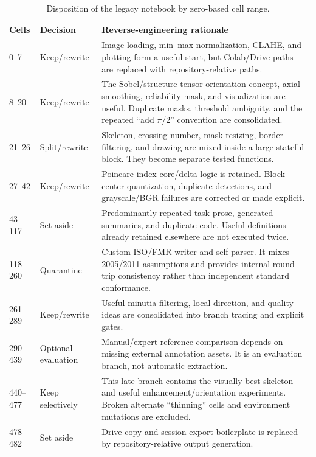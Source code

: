\documentclass[11pt]{article}
\begin{document}
\begin{table}[H]
\centering
\caption{Disposition of the legacy notebook by zero-based cell range.}
\label{tab:cellranges}
\small
\begin{tabularx}{\textwidth}{@{}p{1.45cm}p{2.65cm}X@{}}
\toprule
Cells & Decision & Reverse-engineering rationale \\
\midrule
0--7 & Keep/rewrite & Image loading, min--max normalization, CLAHE, and plotting form a useful start, but Colab/Drive paths are replaced with repository-relative paths. \\
8--20 & Keep/rewrite & The Sobel/structure-tensor orientation concept, axial smoothing, reliability mask, and visualization are useful. Duplicate masks, threshold ambiguity, and the repeated ``add $\pi/2$'' convention are consolidated. \\
21--26 & Split/rewrite & Skeleton, crossing number, mask resizing, border filtering, and drawing are mixed inside a large stateful block. They become separate tested functions. \\
27--42 & Keep/rewrite & Poincare-index core/delta logic is retained. Block-center quantization, duplicate detections, and grayscale/BGR failures are corrected or made explicit. \\
43--117 & Set aside & Predominantly repeated task prose, generated summaries, and duplicate code. Useful definitions already retained elsewhere are not executed twice. \\
118--260 & Quarantine & Custom ISO/FMR writer and self-parser. It mixes 2005/2011 assumptions and provides internal round-trip consistency rather than independent standard conformance. \\
261--289 & Keep/rewrite & Useful minutia filtering, local direction, and quality ideas are consolidated into branch tracing and explicit gates. \\
290--439 & Optional evaluation & Manual/expert-reference comparison depends on missing external annotation assets. It is an evaluation branch, not automatic extraction. \\
440--477 & Keep selectively & This late branch contains the visually best skeleton and useful enhancement/orientation experiments. Broken alternate ``thinning'' cells and environment mutations are excluded. \\
478--482 & Set aside & Drive-copy and session-export boilerplate is replaced by repository-relative output generation. \\
\bottomrule
\end{tabularx}
\end{table}
\end{document}
